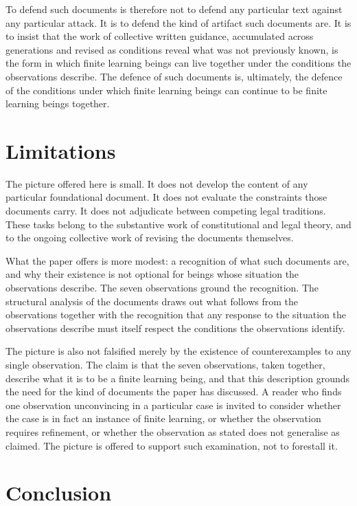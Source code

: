 \documentclass[11pt]{article}
\begin{document}
To defend such documents is therefore not to defend any
particular text against any particular attack. It is to defend
the kind of artifact such documents are. It is to insist that
the work of collective written guidance, accumulated across
generations and revised as conditions reveal what was not
previously known, is the form in which finite learning beings
can live together under the conditions the observations
describe. The defence of such documents is, ultimately, the
defence of the conditions under which finite learning beings can
continue to be finite learning beings together.

\section{Limitations}

The picture offered here is small. It does not develop the
content of any particular foundational document. It does not
evaluate the constraints those documents carry. It does not
adjudicate between competing legal traditions. These tasks
belong to the substantive work of constitutional and legal
theory, and to the ongoing collective work of revising the
documents themselves.

What the paper offers is more modest: a recognition of what such
documents are, and why their existence is not optional for
beings whose situation the observations describe. The seven
observations ground the recognition. The structural analysis of
the documents draws out what follows from the observations
together with the recognition that any response to the
situation the observations describe must itself respect the
conditions the observations identify.

The picture is also not falsified merely by the existence of
counterexamples to any single observation. The claim is that the
seven observations, taken together, describe what it is to be a
finite learning being, and that this description grounds the
need for the kind of documents the paper has discussed. A reader
who finds one observation unconvincing in a particular case is
invited to consider whether the case is in fact an instance of
finite learning, or whether the observation requires refinement,
or whether the observation as stated does not generalise as
claimed. The picture is offered to support such examination,
not to forestall it.

\section{Conclusion}
\end{document}
